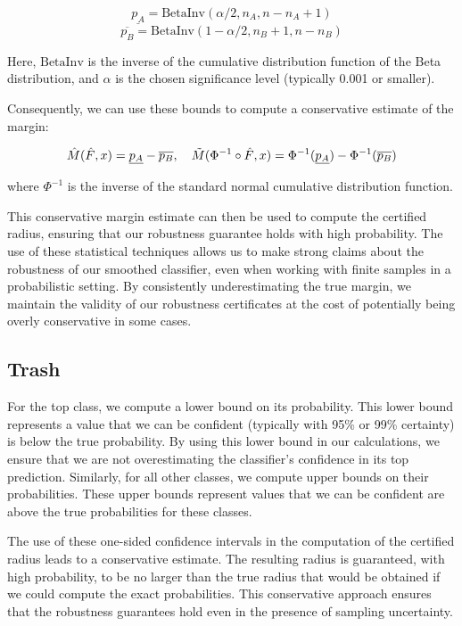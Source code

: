 \begin{equation}
    \underline{p_A} = \text{BetaInv}(\alpha/2, n_A, n - n_A + 1)
\end{equation}
\begin{equation}
    \overline{p_B} = \text{BetaInv}(1-\alpha/2, n_B + 1, n - n_B)
\end{equation}

Here, $\text{BetaInv}$ is the inverse of the cumulative distribution function of the Beta distribution, and $\alpha$ is the chosen significance level (typically 0.001 or smaller).

Consequently, we can use these bounds to compute a conservative estimate of the margin:

\begin{equation}
   \Hat{M}(\Hat{F},x)= \underline{p_A} - \overline{p_B}, \quad\tilde{M}(\Phi^{-1}\circ\Hat{F},x) = \Phi^{-1}(\underline{p_A}) - \Phi^{-1}(\overline{p_B})
\end{equation}

where $\Phi^{-1}$ is the inverse of the standard normal cumulative distribution function.

This conservative margin estimate can then be used to compute the certified radius, ensuring that our robustness guarantee holds with high probability.
The use of these statistical techniques allows us to make strong claims about the robustness of our smoothed classifier, even when working with finite samples in a probabilistic setting.
By consistently underestimating the true margin, we maintain the validity of our robustness certificates at the cost of potentially being overly conservative in some cases.
\subsection{Trash}
For the top class, we compute a lower bound on its probability.
This lower bound represents a value that we can be confident (typically with 95\% or 99\% certainty) is below the true probability.
By using this lower bound in our calculations, we ensure that we are not overestimating the classifier's confidence in its top prediction.
Similarly, for all other classes, we compute upper bounds on their probabilities.
These upper bounds represent values that we can be confident are above the true probabilities for these classes.

The use of these one-sided confidence intervals in the computation of the certified radius leads to a conservative estimate.
The resulting radius is guaranteed, with high probability, to be no larger than the true radius that would be obtained if we could compute the exact probabilities.
This conservative approach ensures that the robustness guarantees hold even in the presence of sampling uncertainty.

